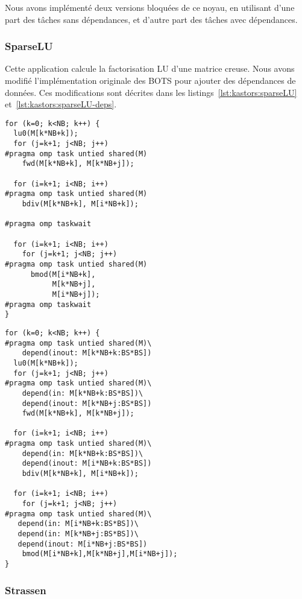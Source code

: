 Nous avons implémenté deux versions bloquées de ce noyau, en utilisant d'une part des tâches sans dépendances, et d'autre part des tâches avec dépendances.

\subsubsection{SparseLU}\label{sec:kastors:sparselu}

Cette application calcule la factorisation LU d'une matrice creuse.
Nous avons modifié l'implémentation originale des BOTS pour ajouter des dépendances de données.
Ces modifications sont décrites dans les listings~\ref{lst:kastors:sparseLU} et~\ref{lst:kastors:sparseLU-deps}.

\begin{lstlisting}[caption=LU utilisant des tâches indépendantes,label=lst:kastors:sparseLU]
for (k=0; k<NB; k++) {
  lu0(M[k*NB+k]);
  for (j=k+1; j<NB; j++)
#pragma omp task untied shared(M)
    fwd(M[k*NB+k], M[k*NB+j]);

  for (i=k+1; i<NB; i++)
#pragma omp task untied shared(M)
    bdiv(M[k*NB+k], M[i*NB+k]);

#pragma omp taskwait

  for (i=k+1; i<NB; i++)
    for (j=k+1; j<NB; j++)
#pragma omp task untied shared(M)
      bmod(M[i*NB+k],
           M[k*NB+j],
           M[i*NB+j]);
#pragma omp taskwait
}
\end{lstlisting}

\begin{lstlisting}[caption=LU utilisant des tâches avec dépendances,label=lst:kastors:sparseLU-deps]
for (k=0; k<NB; k++) {
#pragma omp task untied shared(M)\
    depend(inout: M[k*NB+k:BS*BS])
  lu0(M[k*NB+k]);
  for (j=k+1; j<NB; j++)
#pragma omp task untied shared(M)\
    depend(in: M[k*NB+k:BS*BS])\
    depend(inout: M[k*NB+j:BS*BS])
    fwd(M[k*NB+k], M[k*NB+j]);

  for (i=k+1; i<NB; i++)
#pragma omp task untied shared(M)\
    depend(in: M[k*NB+k:BS*BS])\
    depend(inout: M[i*NB+k:BS*BS])
    bdiv(M[k*NB+k], M[i*NB+k]);

  for (i=k+1; i<NB; i++)
    for (j=k+1; j<NB; j++)
#pragma omp task untied shared(M)\
   depend(in: M[i*NB+k:BS*BS])\
   depend(in: M[k*NB+j:BS*BS])\
   depend(inout: M[i*NB+j:BS*BS])
    bmod(M[i*NB+k],M[k*NB+j],M[i*NB+j]);
}
\end{lstlisting}

\subsubsection{Strassen}\label{sec:kastors:strassen}

